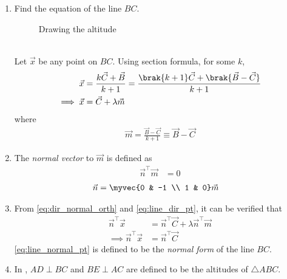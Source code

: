 %
\renewcommand{\theequation}{\theenumi}
\begin{enumerate}[label=\thesection.\arabic*.,ref=\thesection.\theenumi]
%
\item Find the equation of the line $BC$.
%
\begin{figure}[!ht]
	\begin{center}
		\resizebox{\columnwidth}{!}{}
	\end{center}
	\caption{Drawing the altitude}
	\label{fig:tri_alt}	
\end{figure}
\\
\solution Let $\vec{x}$ be any point on $BC$.  Using section formula, for some $k$, 
%
\begin{align}
\vec{x} &= \frac{k\vec{C}+\vec{B}}{k+1} = \frac{\brak{k+1}\vec{C}+\brak{\vec{B}-\vec{C}}}{k+1}
\\
\implies \vec{x} &= \vec{C} + \lambda \vec{m}
\label{eq:line_dir_pt}
\end{align}
%
where 
%
\begin{align}
\vec{m} 
 = \frac{\vec{B}-\vec{C}}{k+1} \equiv \vec{B}-\vec{C}
\label{eq:line_dir_pt-alt}
\end{align}
%
\item The {\em normal vector} to $\vec{m}$ is defined as
%
\begin{align}
\label{eq:dir_normal_orth}
\vec{n}^{\top}\vec{m} &= 0
\end{align}
%
%
\begin{align}
\vec{n} &= \myvec{0 & -1 \\ 1 & 0}\vec{m}
\end{align}
%
\item 
From \eqref{eq:dir_normal_orth} and \eqref{eq:line_dir_pt}, 
it can be verified that 
%
\begin{align}
\vec{n}^{\top}\vec{x} &= \vec{n}^{\top}\vec{C} + \lambda \vec{n}^{\top}\vec{m}
\\
\implies \vec{n}^{\top}\vec{x} &= \vec{n}^{\top}\vec{C}
\label{eq:line_normal_pt}
\end{align}
%
\eqref{eq:line_normal_pt} is defined to be the {\em normal form} of the line $BC$.  
%
\item 
	In ,	
$AD \perp BC$ and $BE \perp AC$ are defined to be the altitudes of $\triangle ABC$. 

\end{enumerate}
